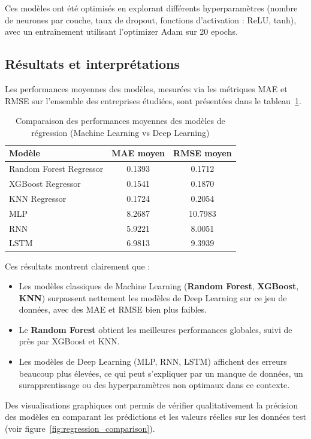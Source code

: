 \documentclass[a4paper,12pt]{article}
\begin{document}
Ces modèles ont été optimisés en explorant différents hyperparamètres (nombre de neurones par couche, taux de dropout, fonctions d’activation : ReLU, tanh), avec un entraînement utilisant l’optimizer Adam sur 20 epochs.

\subsection*{Résultats et interprétations}

Les performances moyennes des modèles, mesurées via les métriques MAE et RMSE sur l'ensemble des entreprises étudiées, sont présentées dans le tableau~\ref{tab:regression_results}.

\begin{table}[h!]
\centering
\begin{tabular}{|l|c|c|}
\hline
\textbf{Modèle} & \textbf{MAE moyen} & \textbf{RMSE moyen}\\
\hline
Random Forest Regressor & 0.1393 & 0.1712\\
XGBoost Regressor & 0.1541 & 0.1870\\
KNN Regressor & 0.1724 & 0.2054\\
MLP & 8.2687 & 10.7983\\
RNN & 5.9221 & 8.0051\\
LSTM & 6.9813 & 9.3939\\
\hline
\end{tabular}
\caption{Comparaison des performances moyennes des modèles de régression (Machine Learning vs Deep Learning)}
\label{tab:regression_results}
\end{table}

Ces résultats montrent clairement que :
\begin{itemize}
    \item Les modèles classiques de Machine Learning (\textbf{Random Forest}, \textbf{XGBoost}, \textbf{KNN}) surpassent nettement les modèles de Deep Learning sur ce jeu de données, avec des MAE et RMSE bien plus faibles.
    \item Le \textbf{Random Forest} obtient les meilleures performances globales, suivi de près par XGBoost et KNN.
    \item Les modèles de Deep Learning (MLP, RNN, LSTM) affichent des erreurs beaucoup plus élevées, ce qui peut s’expliquer par un manque de données, un surapprentissage ou des hyperparamètres non optimaux dans ce contexte.
\end{itemize}

Des visualisations graphiques ont permis de vérifier qualitativement la précision des modèles en comparant les prédictions et les valeurs réelles sur les données test (voir figure~\ref{fig:regression_comparison}).
\end{document}
